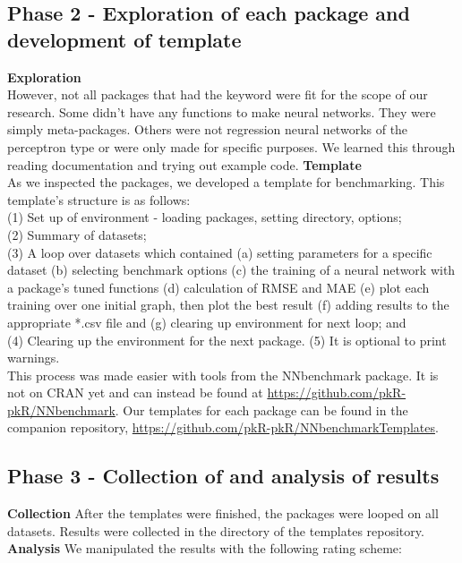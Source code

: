 \hypertarget{phase-2---exploration-of-each-package-and-development-of-template}{%
\subsection{Phase 2 - Exploration of each package and development of
template}\label{phase-2---exploration-of-each-package-and-development-of-template}}

\textbf{Exploration}\\
However, not all packages that had the keyword were fit for the scope of
our research. Some didn't have any functions to make neural networks.
They were simply meta-packages. Others were not regression neural
networks of the perceptron type or were only made for specific purposes.
We learned this through reading documentation and trying out example
code. \textbf{Template}\\
As we inspected the packages, we developed a template for benchmarking.
This template's structure is as follows:\\
(1) Set up of environment - loading packages, setting directory,
options;\\
(2) Summary of datasets;\\
(3) A loop over datasets which contained (a) setting parameters for a
specific dataset (b) selecting benchmark options (c) the training of a
neural network with a package's tuned functions (d) calculation of RMSE
and MAE (e) plot each training over one initial graph, then plot the
best result (f) adding results to the appropriate *.csv file and (g)
clearing up environment for next loop; and\\
(4) Clearing up the environment for the next package. (5) It is optional
to print warnings.\\
This process was made easier with tools from the NNbenchmark package. It
is not on CRAN yet and can instead be found at
\url{https://github.com/pkR-pkR/NNbenchmark}. Our templates for each
package can be found in the companion repository,
\url{https://github.com/pkR-pkR/NNbenchmarkTemplates}.

\hypertarget{phase-3---collection-of-and-analysis-of-results}{%
\subsection{Phase 3 - Collection of and analysis of
results}\label{phase-3---collection-of-and-analysis-of-results}}

\textbf{Collection} After the templates were finished, the packages were
looped on all datasets. Results were collected in the directory of the
templates repository. \textbf{Analysis} We manipulated the results with
the following rating scheme:

